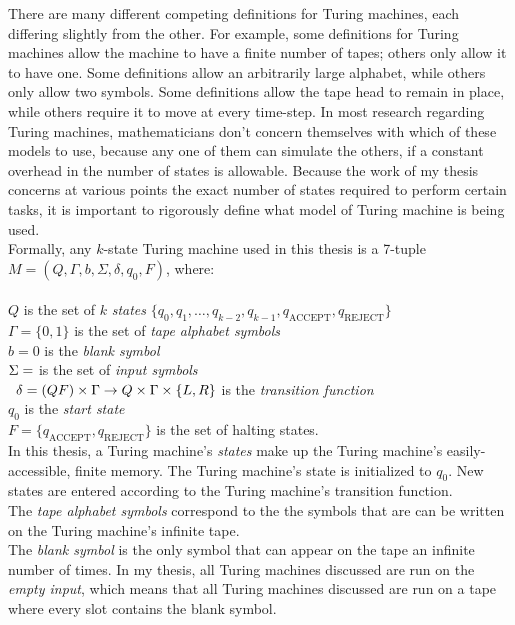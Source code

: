 \documentclass{report}
\begin{document}
There are many different competing definitions for Turing machines, each differing slightly from the other. For example, some definitions for Turing machines allow the machine to have a finite number of tapes; others only allow it to have one. Some definitions allow an arbitrarily large alphabet, while others only allow two symbols. Some definitions allow the tape head to remain in place, while others require it to move at every time-step. In most research regarding Turing machines, mathematicians don't concern themselves with which of these models to use, because any one of them can simulate the others, if a constant overhead in the number of states is allowable. Because the work of my thesis concerns at various points the exact number of states required to perform certain tasks, it is important to rigorously define what model of Turing machine is being used. \\

Formally, any $k$-state Turing machine used in this thesis is a 7-tuple $M = (Q, \Gamma, b, \Sigma, \delta, q_0, F)$, where: \\ \\
$Q$ is the set of $k$ \emph{states} $\{q_0, q_1, \dots, q_{k-2}, q_{k-1}, q_{\textrm{ACCEPT}}, q_{\textrm{REJECT}}\}$ \\
$\Gamma = \{0, 1\}$ is the set of \emph{tape alphabet symbols} \\
$b = 0$ is the \emph{blank symbol} \\
$\Sigma = \empty$ is the set of \emph{input symbols} \\\
$\delta = (Q \\ F) \times \Gamma \rightarrow Q \times \Gamma \times \{L, R\}$ is the \emph{transition function} \\
$q_0$ is the \emph{start state} \\
$F = \{q_{\textrm{ACCEPT}}, q_{\textrm{REJECT}}\}$ is the set of halting states. \\

In this thesis, a Turing machine's \emph{states} make up the Turing machine's easily-accessible, finite memory. The Turing machine's state is initialized to $q_0$. New states are entered according to the Turing machine's transition function. \\

The \emph{tape alphabet symbols} correspond to the the symbols that are can be written on the Turing machine's infinite tape. \\

The \emph{blank symbol} is the only symbol that can appear on the tape an infinite number of times. In my thesis, all Turing machines discussed are run on the \emph{empty input}, which means that all Turing machines discussed are run on a tape where every slot contains the blank symbol. \\
\end{document}
